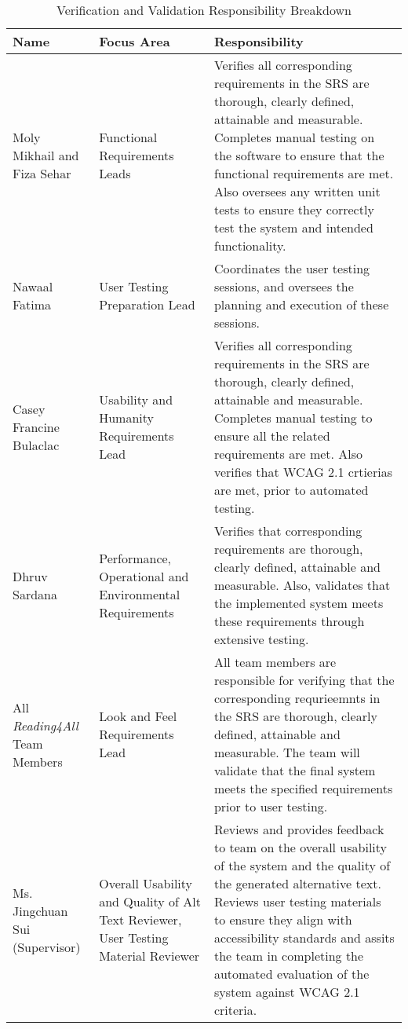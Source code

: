 \documentclass[12pt, titlepage]{article}
\begin{document}
\begin{table}[H]
    \centering
    \caption{Verification and Validation Responsibility Breakdown}
    \label{tab:data-dictionary-reading4all}
    \begin{tabular}{ |p{3.0cm}|p{3.8cm}|p{7.3cm}| }
      \hline
      \textbf{Name} & \textbf{ Focus Area } & \textbf{Responsibility} \\
      \hline
      Moly Mikhail and Fiza Sehar & Functional Requirements Leads & Verifies all corresponding requirements in the SRS are thorough, clearly defined, attainable and measurable. Completes manual testing on the software to ensure that the functional requirements are met. Also oversees any written unit tests to ensure they correctly test the system and intended functionality. \\
      \hline
      Nawaal Fatima & User Testing Preparation Lead & Coordinates the user testing sessions, and oversees the planning and execution of these sessions. \\
      \hline 
      Casey Francine Bulaclac & Usability and Humanity Requirements Lead & Verifies all corresponding requirements in the SRS are thorough, clearly defined, attainable and measurable. Completes manual testing to ensure all the related requirements are met. Also verifies that WCAG 2.1 crtierias are met, prior to automated testing. \\
      \hline 
      Dhruv Sardana & Performance, Operational and Environmental Requirements & Verifies that corresponding requirements are thorough, clearly defined, attainable and measurable. Also, validates that the implemented system meets these requirements through extensive testing.  \\
      \hline 
      All \textit{Reading4All} Team Members & Look and Feel Requirements Lead & All team members are responsible for verifying that the corresponding requrieemnts in the SRS are thorough, clearly defined, attainable and measurable. The team will validate that the final system meets the specified requirements prior to user testing. \\
      \hline
      Ms. Jingchuan Sui (Supervisor) & Overall Usability and Quality of Alt Text Reviewer, User Testing Material Reviewer& Reviews and provides feedback to team on the overall usability of the system and the quality of the generated alternative text. Reviews user testing materials to ensure they align with accessibility standards and assits the team in completing the automated evaluation of the system against WCAG 2.1 criteria. \\ 
      \hline
    \end{tabular}
  \end{table}
  
\end{document}
